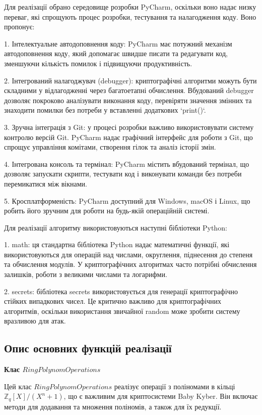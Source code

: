 Для реалізації обрано середовище розробки PyCharm, оскільки воно надає низку переваг, які спрощують процес розробки, тестування та налагодження коду. Воно пропонує:

1. Інтелектуальне автодоповнення коду: PyCharm має потужний механізм автодоповнення коду, який допомагає швидше писати та редагувати код, зменшуючи кількість помилок і підвищуючи продуктивність.  

2. Інтегрований налагоджувач (debugger): криптографічні алгоритми можуть бути складними у відлагодженні через багатоетапні обчислення. Вбудований debugger дозволяє покроково аналізувати виконання коду, перевіряти значення змінних та знаходити помилки без потреби у вставленні додаткових `print()`.   

3. Зручна інтеграція з Git: у процесі розробки важливо використовувати систему контролю версій Git. PyCharm надає графічний інтерфейс для роботи з Git, що спрощує управління комітами, створення гілок та аналіз історії змін.  

4. Інтегрована консоль та термінал: PyCharm містить вбудований термінал, що дозволяє запускати скрипти, тестувати код і виконувати команди без потреби перемикатися між вікнами.  
 
5. Кросплатформеність: PyCharm доступний для Windows, macOS і Linux, що робить його зручним для роботи на будь-якій операційній системі.  

Для реалізації алгоритму використовуються наступні бібліотеки Python:

1. math: ця стандартна бібліотека Python надає математичні функції, які використовуються для операцій над числами, округлення, піднесення до степеня та обчислення модулів. У криптографічних алгоритмах часто потрібні обчислення залишків, роботи з великими числами та логарифми.

2. secrets: бібліотека secrets використовується для генерації криптографічно стійких випадкових чисел. Це критично важливо для криптографічних алгоритмів, оскільки використання звичайної random може зробити систему вразливою для атак.

\subsection*{Опис основних функцій реалізації}

\textbf{Клас $RingPolynomOperations$}

Цей клас $RingPolynomOperations$ реалізує операції з поліномами в кільці $\mathbb{Z}_q[X] / (X^n + 1)$, що є важливим для криптосистеми Baby Kyber. Він включає методи для додавання та множення поліномів, а також для їх редукції.

